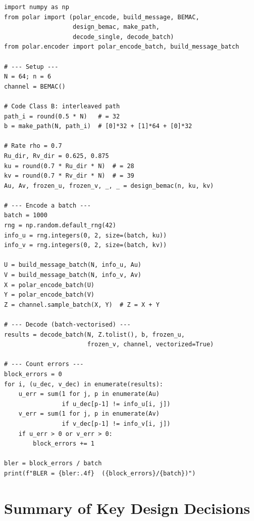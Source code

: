 \documentclass[11pt,a4paper]{article}
\begin{document}
\begin{lstlisting}[caption={Complete pipeline example}]
import numpy as np
from polar import (polar_encode, build_message, BEMAC,
                   design_bemac, make_path,
                   decode_single, decode_batch)
from polar.encoder import polar_encode_batch, build_message_batch

# --- Setup ---
N = 64; n = 6
channel = BEMAC()

# Code Class B: interleaved path
path_i = round(0.5 * N)   # = 32
b = make_path(N, path_i)  # [0]*32 + [1]*64 + [0]*32

# Rate rho = 0.7
Ru_dir, Rv_dir = 0.625, 0.875
ku = round(0.7 * Ru_dir * N)  # = 28
kv = round(0.7 * Rv_dir * N)  # = 39
Au, Av, frozen_u, frozen_v, _, _ = design_bemac(n, ku, kv)

# --- Encode a batch ---
batch = 1000
rng = np.random.default_rng(42)
info_u = rng.integers(0, 2, size=(batch, ku))
info_v = rng.integers(0, 2, size=(batch, kv))

U = build_message_batch(N, info_u, Au)
V = build_message_batch(N, info_v, Av)
X = polar_encode_batch(U)
Y = polar_encode_batch(V)
Z = channel.sample_batch(X, Y)  # Z = X + Y

# --- Decode (batch-vectorised) ---
results = decode_batch(N, Z.tolist(), b, frozen_u,
                       frozen_v, channel, vectorized=True)

# --- Count errors ---
block_errors = 0
for i, (u_dec, v_dec) in enumerate(results):
    u_err = sum(1 for j, p in enumerate(Au)
                if u_dec[p-1] != info_u[i, j])
    v_err = sum(1 for j, p in enumerate(Av)
                if v_dec[p-1] != info_v[i, j])
    if u_err > 0 or v_err > 0:
        block_errors += 1

bler = block_errors / batch
print(f"BLER = {bler:.4f}  ({block_errors}/{batch})")
\end{lstlisting}


\section{Summary of Key Design Decisions}
\end{document}
